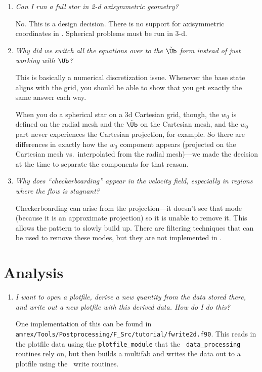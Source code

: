 \begin{enumerate}
\item {\em Can I run a full star in 2-d axisymmetric geometry?}

 No.  This is a design decision.  There is no support for axisymmetric
 coordinates in \maestro.  Spherical problems must be run in 3-d.


\item {\em Why did we switch all the equations over to the
  $\tilde{\Ub}$ form instead of just working with $\Ub$?}

This is basically a numerical discretization issue.  Whenever the base
state aligns with the grid, you should be able to show that you get
exactly the same answer each way.

When you do a spherical star on a 3d Cartesian grid, though, the $w_0$
is defined on the radial mesh and the $\tilde{\Ub}$ on the Cartesian
mesh, and the $w_0$ part never experiences the Cartesian projection,
for example.  So there are differences in exactly how the $w_0$ component
appears (projected on the Cartesian mesh vs.\ interpolated from the
radial mesh)---we made the decision at the time to separate the
components for that reason.


\item {\em Why does ``checkerboarding'' appear in the velocity field,
especially in regions where the flow is stagnant?}

Checkerboarding can arise from the projection---it doesn't see that
mode (because it is an approximate projection) so it is unable to
remove it.  This allows the pattern to slowly build up.  There are
filtering techniques that can be used to remove these modes, but
they are not implemented in \maestro.

\end{enumerate}


\section{Analysis}

\begin{enumerate}

\item {\em I want to open a plotfile, derive a new quantity from
 the data stored there, and write out a new plotfile with this derived 
 data.  How do I do this?}

 One implementation of this can be found in {\tt
   amrex/Tools/Postprocessing/F\_Src/tutorial/fwrite2d.f90}.  This reads in
 the plotfile data using the {\tt plotfile\_module} that the {\tt
   data\_processing} routines rely on, but then builds a multifab
   and writes the data out to a plotfile using the \amrex\ write
   routines.

\end{enumerate}
